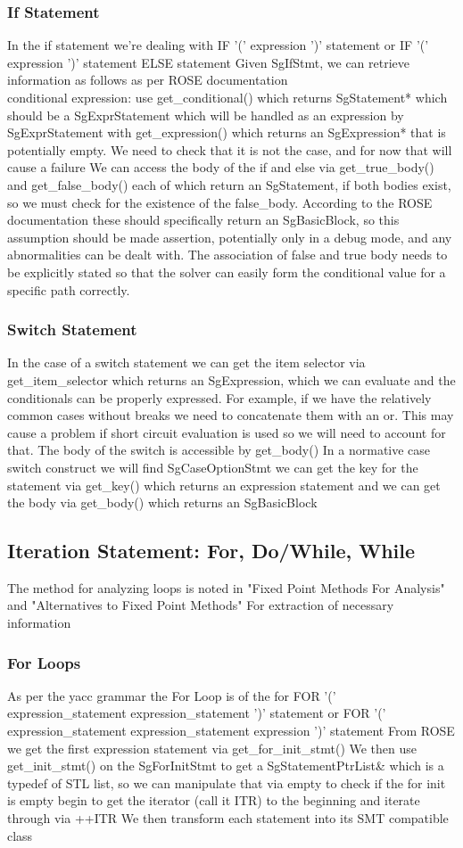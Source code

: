 \documentclass[11pt]{article}
\begin{document}
{\begin{enumeration}
\subsubsection{If Statement}
In the if statement we're dealing with 
IF '(' expression ')' statement
or
IF '(' expression ')' statement ELSE statement
Given SgIfStmt, we can retrieve information as follows as per ROSE documentation\\
conditional expression: use
get\_conditional()
which returns SgStatement* which should be a SgExprStatement which will be handled as an expression by SgExprStatement with
get\_expression()
which returns an SgExpression* that is potentially empty. We need to check that it is not the case, and for now that will cause a failure
We can access the body of the if and else via
get\_true\_body()
and
get\_false\_body()
each of which return an SgStatement, if both bodies exist, so we must check for the existence of the false\_body. According to the ROSE documentation these should specifically return an SgBasicBlock, so this assumption should be made assertion, potentially only in a debug mode, and any abnormalities can be dealt with. The association of false and true body needs to be explicitly stated so that the solver can easily form the conditional value for a specific path correctly.
\subsubsection{Switch Statement}
In the case of a switch statement we can get the item selector via
get\_item\_selector
which returns an SgExpression, which we can evaluate and the conditionals can be properly expressed. For example, if we have the relatively common cases without breaks we need to concatenate them with an or. This may cause a problem if short circuit evaluation is used so we will need to account for that. The body of the switch is accessible by
get\_body()  
In a normative case switch construct we will find
SgCaseOptionStmt
we can get the key for the statement via
get\_key()
which returns an expression statement and we can get the body via
get\_body()
which returns an SgBasicBlock
\subsection{Iteration Statement: For, Do/While, While}
The method for analyzing loops is noted in "Fixed Point Methods For Analysis" and "Alternatives to Fixed Point Methods"
For extraction of necessary information
\subsubsection{For Loops}
As per the yacc grammar the For Loop is of the for
FOR '(' expression\_statement expression\_statement ')' statement
or
FOR '(' expression\_statement expression\_statement expression ')' statement
From ROSE we get the first expression statement via
get\_for\_init\_stmt()
We then use
get\_init\_stmt()
on the SgForInitStmt to get a 
SgStatementPtrList\&
which is a typedef of STL list, so we can manipulate that via
empty
to check if the for init is empty
begin
to get the iterator (call it ITR) to the beginning and iterate through via ++ITR
We then transform each statement into its SMT compatible class

\end{enumeration}}
\end{document}
